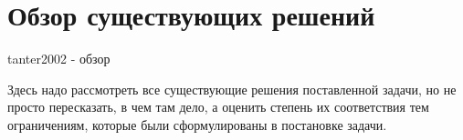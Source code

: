 \section{Обзор существующих решений}
\label{sec:Chapter2} 

\cite{bca}

tanter2002 - обзор 

Здесь надо рассмотреть все существующие решения поставленной задачи, но не
просто пересказать, в чем там дело, а оценить степень их соответствия тем
ограничениям, которые были сформулированы в постановке задачи.

\newpage
